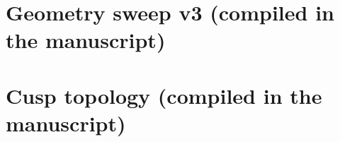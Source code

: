 \documentclass[11pt]{article}
\begin{document}
\section{Geometry sweep v3 (compiled in the manuscript)}\label{sec:l1a-sweep-v3}
\section{Cusp topology (compiled in the manuscript)}\label{sec:cusp-topology}

\end{document}
